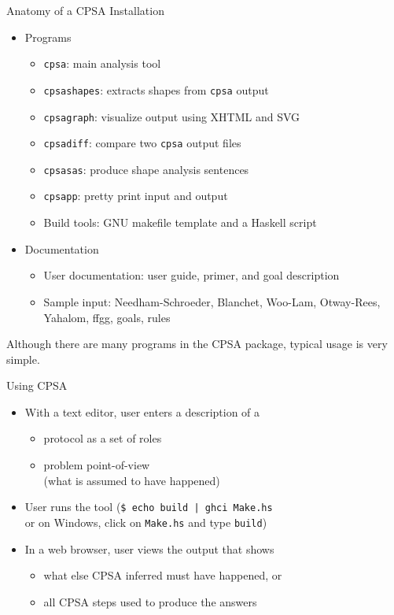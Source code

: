 \documentclass[landscape]{slides}
\newcommand{\cpsa}{CPSA}
\newenvironment{zitemize}
{\begin{itemize}
\setlength{\itemsep}{0em}
\setlength{\topsep}{0em}
\setlength{\partopsep}{0em}
\setlength{\parsep}{0em}
\setlength{\parskip}{0em}}%
{\end{itemize}}
\begin{document}
\begin{mitreslide}{Anatomy of a CPSA Installation}
\begin{zitemize}
\item Programs
\begin{zitemize}
\item \texttt{cpsa}: main analysis tool
\item \texttt{cpsashapes}: extracts shapes from \texttt{cpsa} output
\item \texttt{cpsagraph}: visualize output using XHTML and SVG
\item \texttt{cpsadiff}: compare two \texttt{cpsa} output files
\item \texttt{cpsasas}: produce shape analysis sentences
\item \texttt{cpsapp}: pretty print input and output
\item Build tools: GNU makefile template and a Haskell script
\end{zitemize}
\item Documentation
\begin{zitemize}
\item User documentation: user guide, primer, and goal description
\item Sample input: Needham-Schroeder, Blanchet, Woo-Lam, Otway-Rees,
  Yahalom, ffgg, goals, rules
\end{zitemize}
\end{zitemize}
\end{mitreslide}

\begin{note}
  Although there are many programs in the {\cpsa} package, typical
  usage is very simple.
\end{note}

\begin{mitreslide}{Using CPSA}
\begin{itemize}
\item With a text editor, user enters a description of a
\begin{zitemize}
\item protocol as a set of roles
\item problem point-of-view\\ (what is assumed to have happened)
\end{zitemize}
\item User runs the tool (\texttt{\$ echo build | ghci Make.hs} \\
  or on Windows, click on \texttt{Make.hs} and type \texttt{build})
\item In a web browser, user views the output that shows
\begin{zitemize}
\item what else CPSA inferred must have happened, or
\item all CPSA steps used to produce the answers
\end{zitemize}
\end{itemize}
\end{mitreslide}
\end{document}
